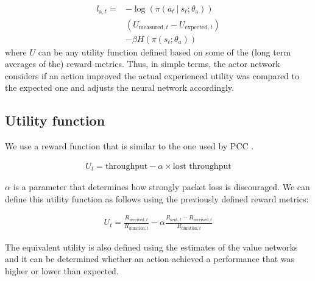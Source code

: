 \documentclass[sigconf]{acmart}
\newcommand\givenbase[1][]{\:#1\lvert\:}
\let\given\givenbase
\begin{document}
\begin{align*}
l_{\text{a},t} =& -\log \left( \pi \left( a_t \given s_t ; \theta_\text{a} \right) \right)\\
& \left( U_{\text{measured},t} - U_{\text{expected},t} \right)\\ 
&- \beta H\left( \pi\left( s_t; \theta_a \right)\right)
\end{align*}
where $U$ can be any utility function defined based on some of the (long term averages of the) reward metrics. Thus, in simple terms, the actor network considers if an action improved the actual experienced utility was compared to the expected one and adjusts the neural network accordingly.
 
\subsection{Utility function}
\label{subsec:utility}


We use a reward function that is similar to the one used by PCC \cite{dong_pcc:_2015}.

\begin{align*}
U_t = \text{throughput} - \alpha \times \text{lost throughput}
\end{align*}

$\alpha$ is a parameter that determines how strongly packet loss is discouraged. We can define this utility function as follows using the previously defined reward metrics: 

\begin{align*}
U_t = \frac{R_{\text{received},t}}{R_{\text{duration},t}} - \alpha \frac{R_{\text{sent},t} - R_{\text{received},t}}{R_{\text{duration},t}}
\end{align*}

The equivalent utility is also defined using the estimates of the value networks and it can be determined whether an action achieved a performance that was higher or lower than expected. 
\end{document}
